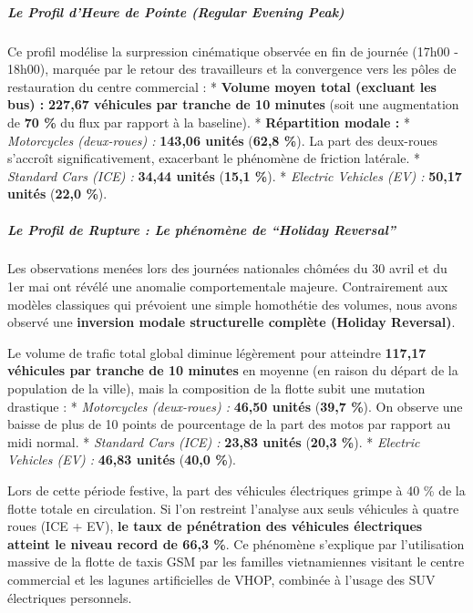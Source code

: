 \documentclass[10pt, a4paper]{article}
\begin{document}
\subparagraph{Le Profil d'Heure de Pointe (Regular Evening
Peak)}\label{le-profil-dheure-de-pointe-regular-evening-peak}

Ce profil modélise la surpression cinématique observée en fin de journée
(17h00 - 18h00), marquée par le retour des travailleurs et la
convergence vers les pôles de restauration du centre commercial : *
\textbf{Volume moyen total (excluant les bus) :} \textbf{227,67
véhicules par tranche de 10 minutes} (soit une augmentation de
\textbf{70 \%} du flux par rapport à la baseline). * \textbf{Répartition
modale :} * \emph{Motorcycles (deux-roues) :} \textbf{143,06 unités}
(\textbf{62,8 \%}). La part des deux-roues s'accroît significativement,
exacerbant le phénomène de friction latérale. * \emph{Standard Cars
(ICE) :} \textbf{34,44 unités} (\textbf{15,1 \%}). * \emph{Electric
Vehicles (EV) :} \textbf{50,17 unités} (\textbf{22,0 \%}).

\subparagraph{Le Profil de Rupture : Le phénomène de ``Holiday
Reversal''}\label{le-profil-de-rupture-le-phuxe9nomuxe8ne-de-holiday-reversal}

Les observations menées lors des journées nationales chômées du 30 avril
et du 1er mai ont révélé une anomalie comportementale majeure.
Contrairement aux modèles classiques qui prévoient une simple homothétie
des volumes, nous avons observé une \textbf{inversion modale
structurelle complète (Holiday Reversal)}.

Le volume de trafic total global diminue légèrement pour atteindre
\textbf{117,17 véhicules par tranche de 10 minutes} en moyenne (en
raison du départ de la population de la ville), mais la composition de
la flotte subit une mutation drastique : * \emph{Motorcycles
(deux-roues) :} \textbf{46,50 unités} (\textbf{39,7 \%}). On observe une
baisse de plus de 10 points de pourcentage de la part des motos par
rapport au midi normal. * \emph{Standard Cars (ICE) :} \textbf{23,83
unités} (\textbf{20,3 \%}). * \emph{Electric Vehicles (EV) :}
\textbf{46,83 unités} (\textbf{40,0 \%}).

Lors de cette période festive, la part des véhicules électriques grimpe
à 40 \% de la flotte totale en circulation. Si l'on restreint l'analyse
aux seuls véhicules à quatre roues (ICE + EV), \textbf{le taux de
pénétration des véhicules électriques atteint le niveau record de 66,3
\%}. Ce phénomène s'explique par l'utilisation massive de la flotte de
taxis GSM par les familles vietnamiennes visitant le centre commercial
et les lagunes artificielles de VHOP, combinée à l'usage des SUV
électriques personnels.
\end{document}

